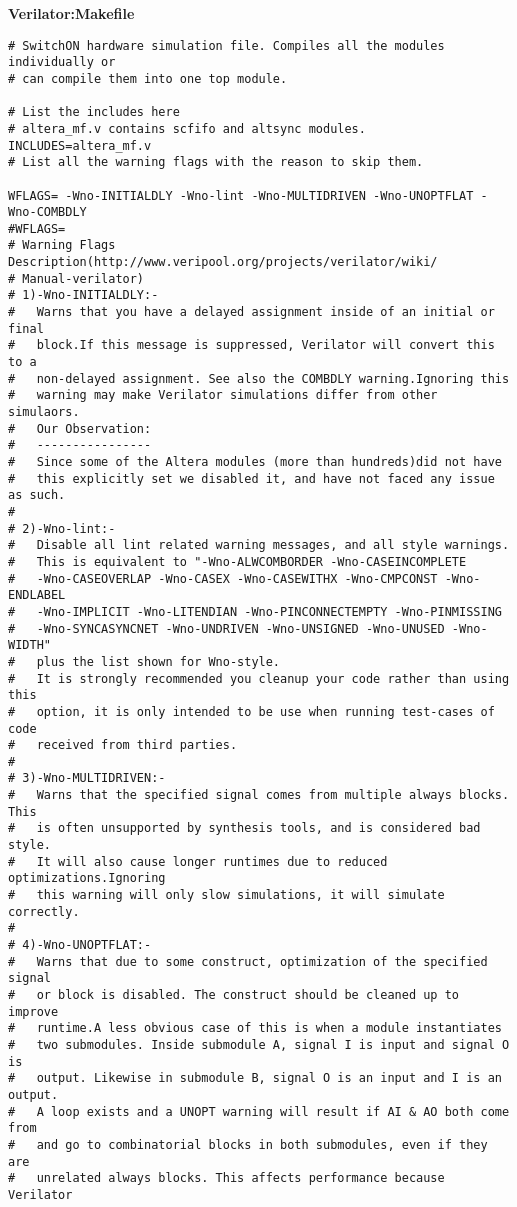 \documentclass[twoside,12pt,fleqn]{book} %
\begin{document}
\newpage
\textbf{Verilator:Makefile}
\begin{lstlisting}
# SwitchON hardware simulation file. Compiles all the modules individually or 
# can compile them into one top module.

# List the includes here
# altera_mf.v contains scfifo and altsync modules.
INCLUDES=altera_mf.v
# List all the warning flags with the reason to skip them.

WFLAGS= -Wno-INITIALDLY -Wno-lint -Wno-MULTIDRIVEN -Wno-UNOPTFLAT -Wno-COMBDLY
#WFLAGS=
# Warning Flags Description(http://www.veripool.org/projects/verilator/wiki/
# Manual-verilator)
# 1)-Wno-INITIALDLY:-
#	Warns that you have a delayed assignment inside of an initial or final 
#	block.If this message is suppressed, Verilator will convert this to a 
#	non-delayed assignment. See also the COMBDLY warning.Ignoring this 
#	warning may make Verilator simulations differ from other simulaors.
#	Our Observation:
#	----------------
#	Since some of the Altera modules (more than hundreds)did not have 
#	this explicitly set we disabled it, and have not faced any issue as such.
# 
# 2)-Wno-lint:-
# 	Disable all lint related warning messages, and all style warnings. 
# 	This is equivalent to "-Wno-ALWCOMBORDER -Wno-CASEINCOMPLETE
# 	-Wno-CASEOVERLAP -Wno-CASEX -Wno-CASEWITHX -Wno-CMPCONST -Wno-ENDLABEL
# 	-Wno-IMPLICIT -Wno-LITENDIAN -Wno-PINCONNECTEMPTY -Wno-PINMISSING 
# 	-Wno-SYNCASYNCNET -Wno-UNDRIVEN -Wno-UNSIGNED -Wno-UNUSED -Wno-WIDTH"
# 	plus the list shown for Wno-style.
#	It is strongly recommended you cleanup your code rather than using this
#	option, it is only intended to be use when running test-cases of code 
#	received from third parties.
#
# 3)-Wno-MULTIDRIVEN:-
# 	Warns that the specified signal comes from multiple always blocks. This
# 	is often unsupported by synthesis tools, and is considered bad style. 
# 	It will also cause longer runtimes due to reduced optimizations.Ignoring
# 	this warning will only slow simulations, it will simulate correctly.
#
# 4)-Wno-UNOPTFLAT:-
# 	Warns that due to some construct, optimization of the specified signal 
# 	or block is disabled. The construct should be cleaned up to improve 
# 	runtime.A less obvious case of this is when a module instantiates 
# 	two submodules. Inside submodule A, signal I is input and signal O is
# 	output. Likewise in submodule B, signal O is an input and I is an output.
# 	A loop exists and a UNOPT warning will result if AI & AO both come from 
# 	and go to combinatorial blocks in both submodules, even if they are 
# 	unrelated always blocks. This affects performance because Verilator 

\end{lstlisting}
\end{document}
